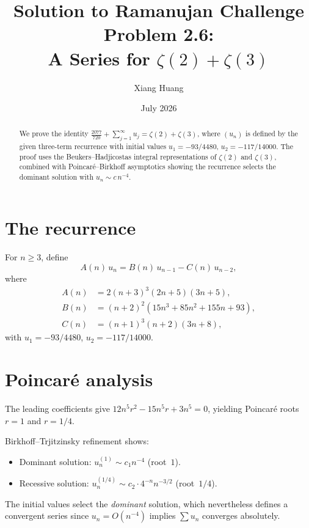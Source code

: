 \documentclass[11pt]{article}
\title{Solution to Ramanujan Challenge Problem 2.6:\\
A Series for $\zeta(2) + \zeta(3)$}
\author{Xiang Huang}
\date{July 2026}
\begin{document}
\maketitle

\begin{abstract}
We prove the identity
$\frac{2077}{720} + \sum_{j=1}^{\infty} u_j = \zeta(2) + \zeta(3)$,
where $(u_n)$ is defined by the given three-term recurrence with
initial values $u_1 = -93/4480$, $u_2 = -117/14000$.
The proof uses the Beukers--Hadjicostas integral representations
of $\zeta(2)$ and $\zeta(3)$, combined with Poincar\'e--Birkhoff
asymptotics showing the recurrence selects the dominant solution
with $u_n \sim c\,n^{-4}$.
\end{abstract}

\section{The recurrence}

For $n \ge 3$, define
\begin{equation}\label{eq:rec}
A(n)\,u_n = B(n)\,u_{n-1} - C(n)\,u_{n-2},
\end{equation}
where
\begin{align*}
A(n) &= 2(n+3)^3(2n+5)(3n+5), \\
B(n) &= (n+2)^2(15n^3 + 85n^2 + 155n + 93), \\
C(n) &= (n+1)^3(n+2)(3n+8),
\end{align*}
with $u_1 = -93/4480$, $u_2 = -117/14000$.

\section{Poincar\'e analysis}

The leading coefficients give
$12n^5 r^2 - 15n^5 r + 3n^5 = 0$,
yielding Poincar\'e roots $r = 1$ and $r = 1/4$.

Birkhoff--Trjitzinsky refinement shows:
\begin{itemize}
\item Dominant solution: $u_n^{(1)} \sim c_1 n^{-4}$ (root~$1$).
\item Recessive solution: $u_n^{(1/4)} \sim c_2 \cdot 4^{-n} n^{-3/2}$
  (root~$1/4$).
\end{itemize}

The initial values select the \emph{dominant} solution, which
nevertheless defines a convergent series since $u_n = O(n^{-4})$
implies $\sum u_n$ converges absolutely.
\end{document}
